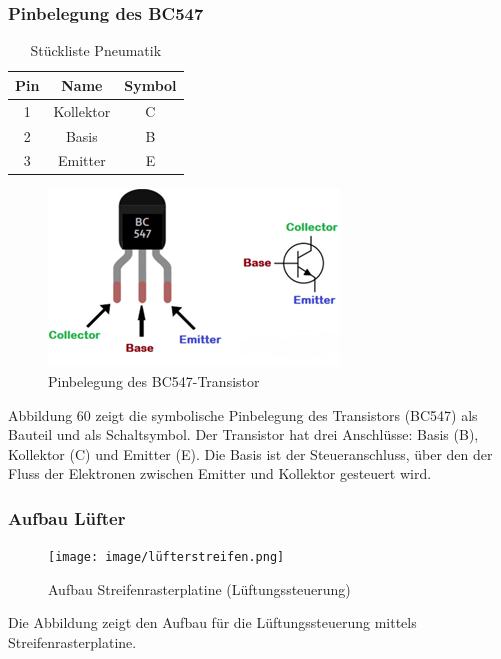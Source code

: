\subsubsection{Pinbelegung des BC547}
\begin{table}[H]
	\centering
	\begin{tabular}{ | c | c | c | } 
		\hline
		\textbf{Pin} & \textbf{Name} &\textbf{Symbol}\\ 
		\hline
		1 & Kollektor & C\\ 
		\hline
		2 & Basis& B\\ 
		\hline
		3 & Emitter & E \\ 
		\hline
	\end{tabular}
	\caption{Stückliste Pneumatik}
\end{table}
\vspace{2mm}
\begin{figure}[H]
	\centering
	\includegraphics{image/pinbelegung transistor.png}
	\caption{Pinbelegung des BC547-Transistor\autocite{BC547Bild}}
	\label{fig:enter-label}
\end{figure}
Abbildung 60 zeigt die symbolische Pinbelegung des Transistors (BC547) als Bauteil und als Schaltsymbol. Der Transistor hat drei Anschlüsse: Basis (B), Kollektor (C) und Emitter (E). Die Basis ist der Steueranschluss, über den der Fluss der Elektronen zwischen Emitter und Kollektor gesteuert wird.

\newpage
\subsubsection{Aufbau Lüfter}
\begin{figure}[H]
    \centering
    \texttt{[image: image/lüfterstreifen.png]}
    \caption{Aufbau Streifenrasterplatine (Lüftungssteuerung)}
    \label{fig:enter-label}
\end{figure}
\vspace{3mm}
Die Abbildung zeigt den Aufbau für die Lüftungssteuerung mittels Streifenrasterplatine. 

